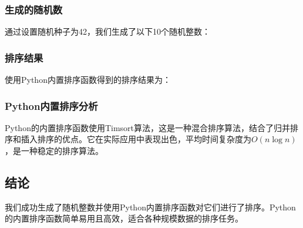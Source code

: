 \documentclass[bwprint]{cumcmthesis}
\begin{document}
\subsubsection{生成的随机数}
通过设置随机种子为42，我们生成了以下10个随机整数：
\begin{equation}
[8, 21, 30, 16, 12, 9, 30, 22, 8, 27]
\end{equation}

\subsubsection{排序结果}
使用Python内置排序函数得到的排序结果为：
\begin{equation}
[8, 8, 9, 12, 16, 21, 22, 27, 30, 30]
\end{equation}

\subsubsection{Python内置排序分析}
Python的内置排序函数使用Timsort算法，这是一种混合排序算法，结合了归并排序和插入排序的优点。它在实际应用中表现出色，平均时间复杂度为$O(n\log n)$，是一种稳定的排序算法。

\subsection{结论}
我们成功生成了随机整数并使用Python内置排序函数对它们进行了排序。Python的内置排序函数简单易用且高效，适合各种规模数据的排序任务。
\end{document}
